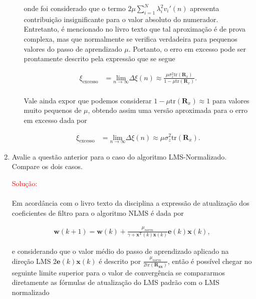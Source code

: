 \documentclass[a4paper,10pt]{article}
\begin{document}
\begin{enumerate}
\begin{enumerate}
						onde foi considerado que o termo $2 \mu \sum^{N}_{i = 1} \lambda^{2}_{i} v_{i}'(n)$ apresenta contribuição insignificante para o valor absoluto do numerador. Entretanto, é mencionado no livro texto que tal aproximação é de prova complexa, mas que normalmente 
						se verifica verdadeira para pequenos valores do passo de aprendizado $\mu$. Portanto, o erro em excesso pode ser prontamente descrito pela expressão que se segue

						\begin{align}
							\xi_{\text{excesso}} &= \underset{n \rightarrow \infty}{\text{lim}} \Delta \xi(n) \approx \frac{\mu \sigma^{2}_{z} \text{tr}(\mathbf{R}_{x})}{1 - \mu \text{tr}(\mathbf{R}_{x})}.
						\end{align}

						\paragraph{}Vale ainda expor que podemos considerar $1 - \mu \text{tr}(\mathbf{R}_{x}) \approx 1$ para valores muito pequenos de $\mu$, obtendo assim uma versão aproximada para o erro em excesso dada por
						
						\begin{align}
							\xi_{\text{excesso}} &= \underset{n \rightarrow \infty}{\text{lim}} \Delta \xi(n) \approx \mu \sigma^{2}_{z} \text{tr}(\mathbf{R}_{x}).
						\end{align}

				\end{enumerate}

			\item Avalie a questão anterior para o caso do algoritmo LMS-Normalizado. Compare os dois casos.
				
			\textcolor{red}{Solução:}

			\paragraph{}Em acordância com o livro texto da disciplina a expressão de atualização dos coeficientes de filtro para o algoritmo NLMS é dada por

			\begin{align}
				\mathbf{w}(k+1) = \mathbf{w}(k) + \frac{\mu_{norm}}{\gamma + \mathbf{x}^{\text{T}}(k) \mathbf{x}(k)} \mathbf{e}(k) \mathbf{x}(k),
			\end{align}

			e considerando que o valor médio do passo de aprendizado aplicado na direção LMS $2 \mathbf{e}(k) \mathbf{x}(k)$ é descrito por $\frac{\mu_{norm}}{2 \text{tr}(\mathbf{R_{xx}})}$, então é possível chegar
			no seguinte limite superior para o valor de convergência se compararmos diretamente as fórmulas de atualização do LMS padrão com o LMS normalizado


\end{enumerate}
\end{document}
